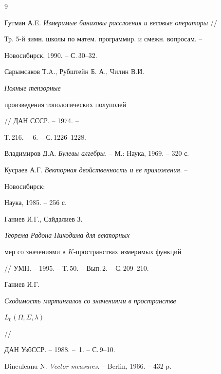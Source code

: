 \begin{thebibliography}{9} 


 




Гутман А.E. {\em Измеримые банаховы расслоения и весовые операторы} // 


Тр. 5-й зимн. школы по матем. программир. и смежн. вопросам. -- 


Новосибирск, 1990. -- С.\,30--32. 




Сарымсаков Т.A., Рубштейн Б. А., Чилин В.И. {\em Полные тензорные 


произведения топологических полуполей} // ДАН СССР. -- 1974. -- 


Т.\,216. -- \No\,6. -- С.\,1226--1228. 




Владимиров Д.А. {\em Булевы алгебры}. -- М.: Наука, 1969. -- 320 с. 




Кусраев А.Г. {\em Векторная двойственность и ее приложения}. -- 


Новосибирск: 


Наука, 1985. -- 256 с. 




Ганиев И.Г., Сайдалиев З. {\em Теорема Радона-Никодима для векторных 


мер со значениями в $K$-пространствах измеримых функций}  


// УМН. -- 1995. -- Т.\,50. -- Вып.\,2. -- С.\,209--210. 




Ганиев И.Г. {\em Сходимость мартингалов со значениями в пространстве 


$L_0(\Omega,\Sigma,\lambda)$} // 


ДАН УзбССР. -- 1988. -- \No\,1. -- С.\,9--10. 




Dinculeanu N. {\em Vector measures}. -- Berlin, 1966. -- 432 p. 


 


\end{thebibliography} 


 


\vskip 2cm 


 






 


\label{end} 


 


